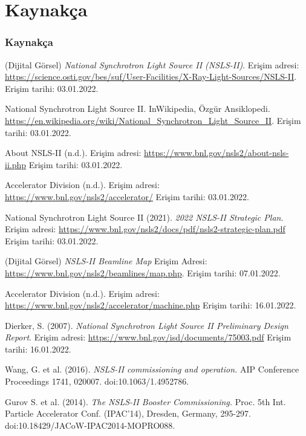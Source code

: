 \documentclass[aspectratio=169,10pt]{beamer}
\begin{document}
\section{Kaynakça}
\begin{frame}[allowframebreaks]
\frametitle{Kaynakça}

	\begin{thebibliography}{99}
	
			 (Dijital Görsel) \textit{National Synchrotron Light Source II (NSLS-II)}. Erişim adresi: \url{https://science.osti.gov/bes/suf/User-Facilities/X-Ray-Light-Sources/NSLS-II}. Erişim tarihi: 03.01.2022.
	
	 National Synchrotron Light Source II. InWikipedia, Özgür Ansiklopedi. \url{https://en.wikipedia.org/wiki/National_Synchrotron_Light_Source_II}. Erişim tarihi: 03.01.2022.  
	
	 About NSLS-II (n.d.). Erişim adresi: \url{https://www.bnl.gov/nsls2/about-nsls-ii.php} Erişim tarihi: 03.01.2022.
	
	 Accelerator Division (n.d.). Erişim adresi: \url{https://www.bnl.gov/nsls2/accelerator/} Erişim tarihi: 03.01.2022.
	
	 National Synchrotron Light Source II (2021). \textit{2022 NSLS-II Strategic Plan}. Erişim adresi: \url{https://www.bnl.gov/nsls2/docs/pdf/nsls2-strategic-plan.pdf} Erişim tarihi: 03.01.2022.
	
	 (Dijital Görsel) \textit{NSLS-II Beamline Map} Erişim Adresi: \url{https://www.bnl.gov/nsls2/beamlines/map.php}. Erişim tarihi: 07.01.2022.
	
	  Accelerator Division (n.d.). Erişim adresi: \url{https://www.bnl.gov/nsls2/accelerator/machine.php} Erişim tarihi: 16.01.2022.
	 
	   Dierker, S. (2007). \textit{National Synchrotron Light Source II
Preliminary Design Report}. Erişim adresi: \url{https://www.bnl.gov/isd/documents/75003.pdf} Erişim tarihi: 16.01.2022.
	
	
	 Wang, G. et al. (2016). \textit{NSLS-II commissioning and operation.} AIP Conference Proceedings 1741, 020007. doi:10.1063/1.4952786.
	
	 Gurov S. et al. (2014). \textit{The NSLS-II Booster Commissioning.}  Proc. 5th Int. Particle Accelerator Conf. (IPAC'14), Dresden, Germany, 295-297. doi:10.18429/JACoW-IPAC2014-MOPRO088.
	

\end{thebibliography}
\end{frame}
\end{document}
